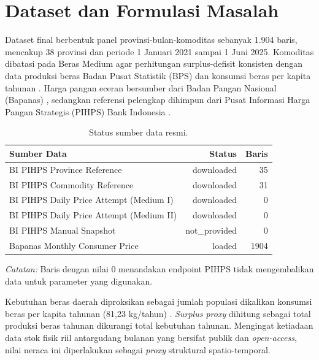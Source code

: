 \documentclass[journal, a4paper]{IEEEtran}
\begin{document}
\section{Dataset dan Formulasi Masalah}
Dataset final berbentuk panel provinsi-bulan-komoditas sebanyak 1.904 baris, mencakup 38 provinsi dan periode 1 Januari 2021 sampai 1 Juni 2025. Komoditas dibatasi pada Beras Medium agar perhitungan surplus-defisit konsisten dengan data produksi beras Badan Pusat Statistik (BPS) \cite{16} dan konsumsi beras per kapita tahunan \cite{17}. Harga pangan eceran bersumber dari Badan Pangan Nasional (Bapanas) \cite{15}, sedangkan referensi pelengkap dihimpun dari Pusat Informasi Harga Pangan Strategis (PIHPS) Bank Indonesia \cite{14}.

\begin{table}[H]
  \footnotesize
  \caption{Status sumber data resmi.}
  \label{tab:source_status}
  \begin{tabular}{lrr}
    \toprule
    Sumber Data & Status & Baris \\
    \midrule
    BI PIHPS Province Reference & downloaded & 35 \\
    BI PIHPS Commodity Reference & downloaded & 31 \\
    BI PIHPS Daily Price Attempt (Medium I) & downloaded & 0 \\
    BI PIHPS Daily Price Attempt (Medium II) & downloaded & 0 \\
    BI PIHPS Manual Snapshot & not\_provided & 0 \\
    Bapanas Monthly Consumer Price & loaded & 1904 \\
    \bottomrule
  \end{tabular}
  \par\vspace{6pt}
  {\footnotesize \textit{Catatan:} Baris dengan nilai 0 menandakan endpoint PIHPS tidak mengembalikan data untuk parameter yang digunakan.}
  \end{table}
Kebutuhan beras daerah diproksikan sebagai jumlah populasi dikalikan konsumsi beras per kapita tahunan (81,23 kg/tahun) \cite{17}. \textit{Surplus proxy} dihitung sebagai total produksi beras tahunan \cite{16} dikurangi total kebutuhan tahunan. Mengingat ketiadaan data stok fisik riil antargudang bulanan yang bersifat publik dan \textit{open-access}, nilai neraca ini diperlakukan sebagai \textit{proxy} struktural spatio-temporal.
\end{document}

